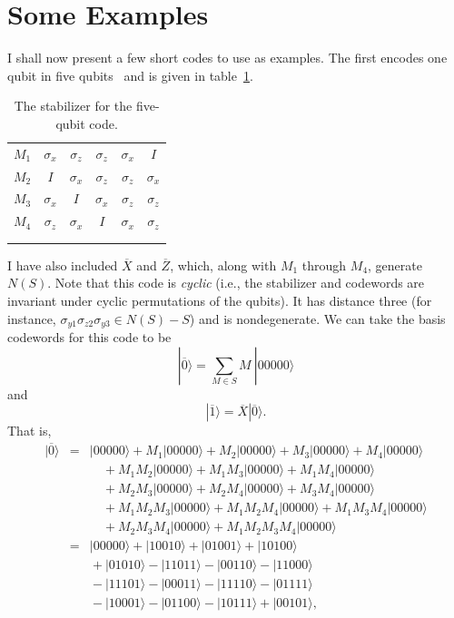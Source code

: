\documentclass{report}
\newcommand{\ket}[1]{|{#1}\rangle}
\newcommand{\X}{\sigma_x}
\newcommand{\Z}{\sigma_z}
\newcommand{\Ys}[1]{\sigma_{y{#1}}}
\newcommand{\Zs}[1]{\sigma_{z{#1}}}
\newcommand{\Xbar}{\overline{X}}
\newcommand{\Zbar}{\overline{Z}}
\newcommand{\Sum}{\sum}
\newcommand{\low}[1]{\raisebox{-0.3ex}{{#1}}}
\begin{document}
\section{Some Examples}
\label{sec-stab-examples}

I shall now present a few short codes to use as examples.  The first 
encodes one qubit in five qubits~\cite{bennett-tome,laflamme-5qubit} and is 
given in table~\ref{table-5qubit}.
\begin{table}
\centering
\begin{tabular}{c|ccccc}
$M_1$ & $\X$ & $\Z$ & $\Z$ & $\X$ & $I$ \\
$M_2$ & $I$ & $\X$ & $\Z$ & $\Z$ & $\X$ \\
$M_3$ & $\X$ & $I$ & $\X$ & $\Z$ & $\Z$ \\
$M_4$ & $\Z$ & $\X$ & $I$ & $\X$ & $\Z$ \\
\hline
\low{$\Xbar$} & \low{$\X$} & \low{$\X$} & \low{$\X$} & \low{$\X$} & \low{$\X$} 
\\
\low{$\Zbar$} & \low{$\Z$} & \low{$\Z$} & \low{$\Z$} & \low{$\Z$} & \low{$\Z$}
\end{tabular}
\caption{The stabilizer for the five-qubit code.}
\label{table-5qubit}
\end{table}
I have also included $\Xbar$ and $\Zbar$, which, along with $M_1$ 
through $M_4$, generate $N(S)$.  Note that this code is {\em cyclic} (i.e., 
the stabilizer and codewords are invariant under cyclic permutations of
the qubits).  It has distance three (for instance, $\Ys{1} \Zs{2} \Ys{3} \in 
N(S)-S$) and is nondegenerate.  We can take the basis codewords for this code 
to be
\begin{equation}
\ket{\overline{0}} = \Sum_{M \in S} M \ \ket{00000}
\end{equation}
and
\begin{equation}
\ket{\overline{1}} = \Xbar \ket{\overline{0}}.
\end{equation}
That is,
\begin{eqnarray}
\ket{\overline{0}} & = & \ket{00000} + M_1 \ket{00000} + M_2 \ket{00000} +
M_3 \ket{00000} + M_4 \ket{00000} \nonumber \\
& & \quad \mbox{} + M_1 M_2 \ket{00000} + M_1 M_3 \ket{00000} +
M_1 M_4 \ket{00000} \nonumber \\
& & \quad \mbox{} + M_2 M_3 \ket{00000} + M_2 M_4 \ket{00000} + 
M_3 M_4 \ket{00000} \\
& & \quad \mbox{} + M_1 M_2 M_3 \ket{00000} + M_1 M_2 M_4 \ket{00000} + 
M_1 M_3 M_4 \ket{00000} \nonumber \\
& & \quad \mbox{} + M_2 M_3 M_4 \ket{00000} + M_1 M_2 M_3 M_4 \ket{00000} 
\nonumber \\
& = & \ket{00000} + \ket{10010} + \ket{01001} + \ket{10100} \nonumber \\
& & \mbox{} + \ket{01010} - \ket{11011} - \ket{00110} - \ket{11000} \nonumber \\
& & \mbox{} - \ket{11101} - \ket{00011} - \ket{11110} - \ket{01111} \\
& & \mbox{} - \ket{10001} - \ket{01100} - \ket{10111} + \ket{00101}, \nonumber
\end{eqnarray}
\end{document}
